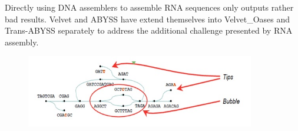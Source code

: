 \documentclass{article}
\begin{document}
Directly using DNA assemblers to assemble RNA sequences only outputs rather bad results. Velvet and ABYSS have extend themselves into Velvet\_Oases and Trans-ABYSS separately to address the additional challenge presented by RNA assembly. 
\begin{figure}[ht]
  \centering
  \includegraphics[width=10cm]{Figure7.jpg}\\
  \caption{}\label{branch_example}
\end{figure}
\renewcommand\refname{Reference}


\end{document}
